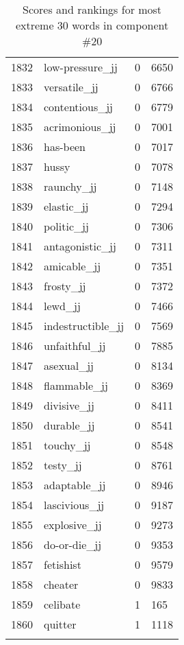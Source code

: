 \begin{longtable}[!htbp]{| rlr@{.}l |}
    1832 & low-pressure\_jj & 0 & 6650 \\
    1833 & versatile\_jj & 0 & 6766 \\
    1834 & contentious\_jj & 0 & 6779 \\
    1835 & acrimonious\_jj & 0 & 7001 \\
    1836 & has-been & 0 & 7017 \\
    1837 & hussy & 0 & 7078 \\
    1838 & raunchy\_jj & 0 & 7148 \\
    1839 & elastic\_jj & 0 & 7294 \\
    1840 & politic\_jj & 0 & 7306 \\
    1841 & antagonistic\_jj & 0 & 7311 \\
    1842 & amicable\_jj & 0 & 7351 \\
    1843 & frosty\_jj & 0 & 7372 \\
    1844 & lewd\_jj & 0 & 7466 \\
    1845 & indestructible\_jj & 0 & 7569 \\
    1846 & unfaithful\_jj & 0 & 7885 \\
    1847 & asexual\_jj & 0 & 8134 \\
    1848 & flammable\_jj & 0 & 8369 \\
    1849 & divisive\_jj & 0 & 8411 \\
    1850 & durable\_jj & 0 & 8541 \\
    1851 & touchy\_jj & 0 & 8548 \\
    1852 & testy\_jj & 0 & 8761 \\
    1853 & adaptable\_jj & 0 & 8946 \\
    1854 & lascivious\_jj & 0 & 9187 \\
    1855 & explosive\_jj & 0 & 9273 \\
    1856 & do-or-die\_jj & 0 & 9353 \\
    1857 & fetishist & 0 & 9579 \\
    1858 & cheater & 0 & 9833 \\
    1859 & celibate & 1 & 165 \\
    1860 & quitter & 1 & 1118 \\
    \hline
    \caption{Scores and rankings for most extreme 30 words in component \#20} \\
\end{longtable}
